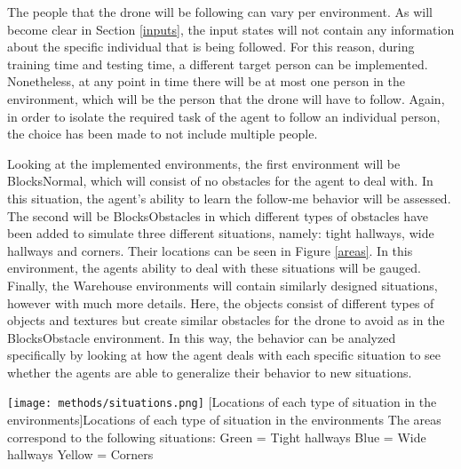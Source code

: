 The people that the drone will be following can vary per environment. As will become clear 
in Section \ref{inputs}, the input states will not contain any information about 
the specific individual that is being followed. For this reason, during training time and 
testing time, a different target person can be implemented. Nonetheless, at any point in 
time there will be at most one person in the environment, which will be the person that 
the drone will have to follow. Again, in order to isolate the required task of the 
agent to follow an individual person, the choice has been made to not include multiple 
people. 

Looking at the implemented environments, the first environment will be BlocksNormal, which will 
consist of no obstacles for the 
agent to deal with. In this situation, the agent's ability to learn the follow-me behavior 
will be assessed. The second will be BlocksObstacles in which different types of 
obstacles have been added to simulate three different situations, namely: tight 
hallways, wide hallways and corners. Their locations can be seen in Figure \ref{areas}.
In this environment, the agents ability to deal with these situations will be gauged.
Finally, the Warehouse environments will contain similarly designed situations, 
however with much more details. Here, the objects consist of different types of 
objects and textures but create similar obstacles for the drone to avoid as in the 
BlocksObstacle environment. In this way, the behavior can be analyzed specifically by 
looking at how the agent deals with each specific situation to see whether the agents 
are able to generalize their behavior to new situations.


\begin{SCfigure}
    \centering
    \texttt{[image: methods/situations.png]}
    [Locations of each type of situation in the environments]{Locations of each type of situation in the environments\newline\newline
    The areas correspond to the following situations: \newline
    Green = Tight hallways\newline
    Blue = Wide hallways \newline
    Yellow = Corners\newline\newline}
    \label{areas}
\end{SCfigure}


